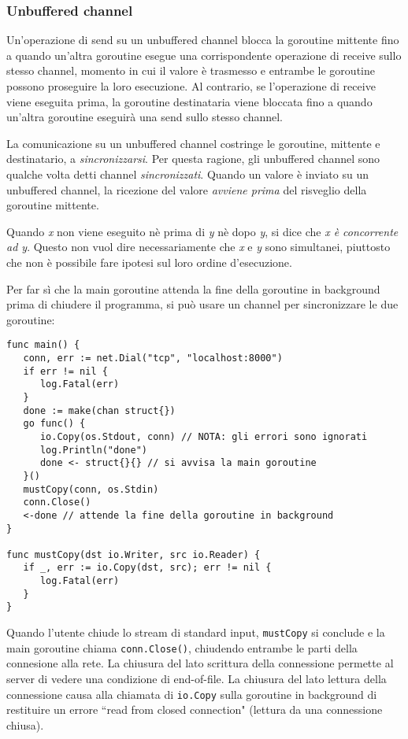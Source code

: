 \documentclass[../../../thesis.tex]{subfiles}
\begin{document}
    \subsubsection{Unbuffered channel}
    Un'operazione di send su un unbuffered channel blocca la goroutine mittente fino a quando un'altra goroutine esegue una corrispondente operazione di receive sullo stesso channel, momento in cui il valore è trasmesso e entrambe le goroutine possono proseguire la loro esecuzione.
    Al contrario, se l'operazione di receive viene eseguita prima, la goroutine destinataria viene bloccata fino a quando un'altra goroutine eseguirà una send sullo stesso channel.
    \hfill \vspace{12pt}

    La comunicazione su un unbuffered channel costringe le goroutine, mittente e destinatario, a \textit{sincronizzarsi}.
    Per questa ragione, gli unbuffered channel sono qualche volta detti channel \textit{sincronizzati}.
    Quando un valore è inviato su un unbuffered channel, la ricezione del valore \textit{avviene prima} del risveglio della goroutine mittente.
    \hfill \vspace{12pt}

    Quando \textit{x} non viene eseguito nè prima di \textit{y} nè dopo \textit{y}, si dice che \textit{x è concorrente ad y}.
    Questo non vuol dire necessariamente che \textit{x} e \textit{y} sono simultanei, piuttosto che non è possibile fare ipotesi sul loro ordine d'esecuzione.
    \hfill \vspace{12pt}

    Per far sì che la main goroutine attenda la fine della goroutine in background prima di chiudere il programma, si può usare un channel per sincronizzare le due goroutine:
    \begin{lstlisting}[frame = single, label = {lst:lstlisting7-4-1.1}]
func main() {
   conn, err := net.Dial("tcp", "localhost:8000")
   if err != nil {
      log.Fatal(err)
   }
   done := make(chan struct{})
   go func() {
      io.Copy(os.Stdout, conn) // NOTA: gli errori sono ignorati
      log.Println("done")
      done <- struct{}{} // si avvisa la main goroutine
   }()
   mustCopy(conn, os.Stdin)
   conn.Close()
   <-done // attende la fine della goroutine in background
}

func mustCopy(dst io.Writer, src io.Reader) {
   if _, err := io.Copy(dst, src); err != nil {
      log.Fatal(err)
   }
}
    \end{lstlisting}
    Quando l'utente chiude lo stream di standard input, \verb"mustCopy" si conclude e la main goroutine chiama \verb"conn.Close()", chiudendo entrambe le parti della connesione alla rete.
    La chiusura del lato scrittura della connessione permette al server di vedere una condizione di end-of-file.
    La chiusura del lato lettura della connessione causa alla chiamata di \verb"io.Copy" sulla goroutine in background di restituire un errore ``read from closed connection" (lettura da una connessione chiusa).
    \hfill \vspace{12pt}
\end{document}
